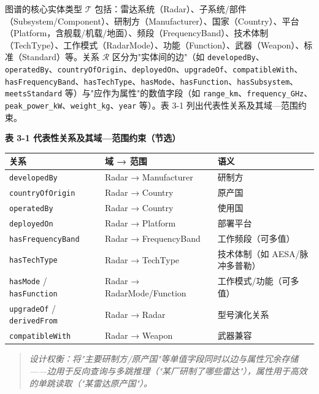 \documentclass[12pt,a4paper]{ctexart}
\begin{document}
图谱的核心实体类型 $\mathcal{T}$ 包括：雷达系统（Radar）、子系统/部件（Subsystem/Component）、研制方（Manufacturer）、国家（Country）、平台（Platform，含舰载/机载/地面）、频段（FrequencyBand）、技术体制（TechType）、工作模式（RadarMode）、功能（Function）、武器（Weapon）、标准（Standard）等。关系 $\mathcal{R}$ 区分为"实体间的边"（如 \texttt{developedBy}、\texttt{operatedBy}、\texttt{countryOfOrigin}、\texttt{deployedOn}、\texttt{upgradeOf}、\texttt{compatibleWith}、\texttt{hasFrequencyBand}、\texttt{hasTechType}、\texttt{hasMode}、\texttt{hasFunction}、\texttt{hasSubsystem}、\texttt{meetsStandard} 等）与"应作为属性"的数值字段（如 \texttt{range\_km}、\texttt{frequency\_GHz}、\texttt{peak\_power\_kW}、\texttt{weight\_kg}、\texttt{year} 等）。表 3-1 列出代表性关系及其域—范围约束。

\textbf{表 3-1 代表性关系及其域—范围约束（节选）}

\begin{center}\small
\begin{tabular}{|p{}|p{}|p{}|}
\hline
\textbf{关系} & \textbf{域 → 范围} & \textbf{语义} \\ \hline
\texttt{developedBy} & Radar → Manufacturer & 研制方 \\ \hline
\texttt{countryOfOrigin} & Radar → Country & 原产国 \\ \hline
\texttt{operatedBy} & Radar → Country & 使用国 \\ \hline
\texttt{deployedOn} & Radar → Platform & 部署平台 \\ \hline
\texttt{hasFrequencyBand} & Radar → FrequencyBand & 工作频段（可多值） \\ \hline
\texttt{hasTechType} & Radar → TechType & 技术体制（如 AESA/脉冲多普勒） \\ \hline
\texttt{hasMode} / \texttt{hasFunction} & Radar → RadarMode/Function & 工作模式/功能（可多值） \\ \hline
\texttt{upgradeOf} / \texttt{derivedFrom} & Radar → Radar & 型号演化关系 \\ \hline
\texttt{compatibleWith} & Radar → Weapon & 武器兼容 \\ \hline
\end{tabular}
\end{center}

\begin{quote}\itshape 设计权衡：将"主要研制方/原产国"等单值字段同时以边与属性冗余存储——边用于反向查询与多跳推理（"某厂研制了哪些雷达"），属性用于高效的单跳读取（"某雷达原产国"）。\end{quote}
\end{document}
